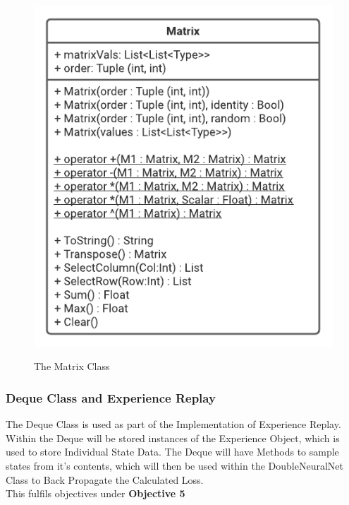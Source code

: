\begin{flushleft}
                \begin{figure}[H]
                    \centering
                    \includegraphics[width=.55\textwidth]{Images/Design/Classes/Matrix.png} \\
                    \caption*{The Matrix Class}
                \end{figure}
            \subsubsection{Deque Class and Experience Replay}
                The Deque Class is used as part of the Implementation of Experience Replay. Within the Deque will be stored instances
                of the Experience Object, which is used to store Individual State Data. The Deque will have Methods to sample states from
                it's contents, which will then be used within the DoubleNeuralNet Class to Back Propagate the Calculated Loss.\\
                \vspace{0.2cm}
                This fulfils objectives under \textbf{Objective 5} \\
            

\end{flushleft}
